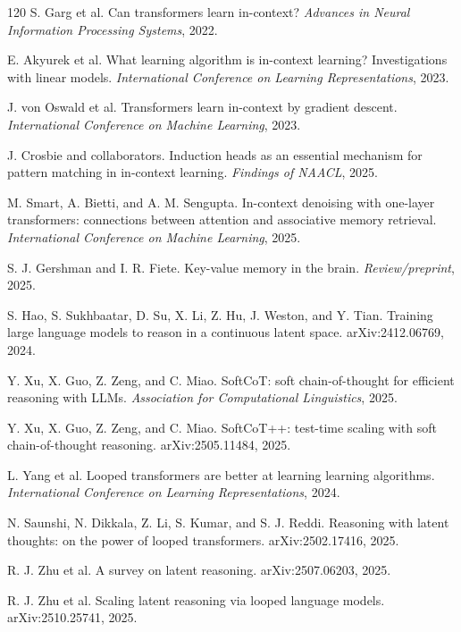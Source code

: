 \documentclass[11pt]{article}
\newcommand{\1}{\mathbf{1}}
\begin{document}
\begin{thebibliography}{120}
S. Garg et al. Can transformers learn in-context? \emph{Advances in Neural Information Processing Systems}, 2022.

E. Akyurek et al. What learning algorithm is in-context learning? Investigations with linear models. \emph{International Conference on Learning Representations}, 2023.

J. von Oswald et al. Transformers learn in-context by gradient descent. \emph{International Conference on Machine Learning}, 2023.

J. Crosbie and collaborators. Induction heads as an essential mechanism for pattern matching in in-context learning. \emph{Findings of NAACL}, 2025.

M. Smart, A. Bietti, and A. M. Sengupta. In-context denoising with one-layer transformers: connections between attention and associative memory retrieval. \emph{International Conference on Machine Learning}, 2025.

S. J. Gershman and I. R. Fiete. Key-value memory in the brain. \emph{Review/preprint}, 2025.

S. Hao, S. Sukhbaatar, D. Su, X. Li, Z. Hu, J. Weston, and Y. Tian. Training large language models to reason in a continuous latent space. arXiv:2412.06769, 2024.

Y. Xu, X. Guo, Z. Zeng, and C. Miao. SoftCoT: soft chain-of-thought for efficient reasoning with LLMs. \emph{Association for Computational Linguistics}, 2025.

Y. Xu, X. Guo, Z. Zeng, and C. Miao. SoftCoT++: test-time scaling with soft chain-of-thought reasoning. arXiv:2505.11484, 2025.

L. Yang et al. Looped transformers are better at learning learning algorithms. \emph{International Conference on Learning Representations}, 2024.

N. Saunshi, N. Dikkala, Z. Li, S. Kumar, and S. J. Reddi. Reasoning with latent thoughts: on the power of looped transformers. arXiv:2502.17416, 2025.

R. J. Zhu et al. A survey on latent reasoning. arXiv:2507.06203, 2025.

R. J. Zhu et al. Scaling latent reasoning via looped language models. arXiv:2510.25741, 2025.


\end{thebibliography}
\end{document}
